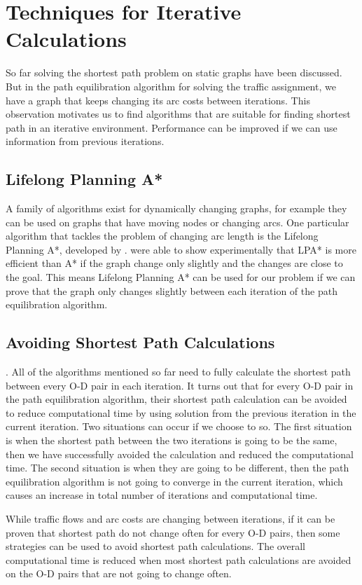 \section{Techniques for Iterative Calculations}
So far solving the shortest path problem on static graphs have been discussed.
But in the path equilibration algorithm for solving the traffic assignment,
we have a graph that keeps changing its arc costs between iterations.
This observation motivates us to find algorithms that are suitable for finding shortest path in an iterative environment.
Performance can be improved if we can use information from previous iterations.

\subsection{Lifelong Planning A*}
A family of algorithms exist for dynamically changing graphs,
for example they can be used on graphs that have moving nodes or changing arcs.
One particular algorithm that tackles the problem of changing arc length is the Lifelong Planning A*, developed by \citet{LPA*}.
\citet{LPA*} were able to show experimentally that LPA* is more efficient than A* if the graph change only slightly and the changes are close to the goal.
This means Lifelong Planning A* can be used for our problem if we can prove that the graph only changes slightly between each iteration of the path equilibration algorithm.

\subsection{Avoiding Shortest Path Calculations} \label{section:avoid}.
All of the algorithms mentioned so far need to fully calculate the shortest path between every O-D pair in each iteration.
It turns out that for every O-D pair in the path equilibration algorithm,
their shortest path calculation can be avoided to reduce computational time by using solution from the previous iteration in the current iteration.
Two situations can occur if we choose to so.
The first situation is when the shortest path between the two iterations is going to be the same,
then we have successfully avoided the calculation and reduced the computational time.
The second situation is when they are going to be different,
then the path equilibration algorithm is not going to converge in the current iteration,
which causes an increase in total number of iterations and computational time.

While traffic flows and arc costs are changing between iterations,
if it can be proven that shortest path do not change often for every O-D pairs,
then some strategies can be used to avoid shortest path calculations.
The overall computational time is reduced when most shortest path calculations are avoided on the O-D pairs that are not going to change often.

